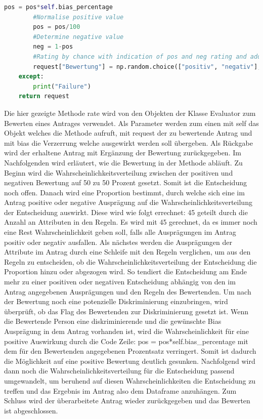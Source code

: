 \begin{onehalfspace}
\begin{lstlisting}[language=Python,label={lst:Evaluator_rate},caption=Methode eines Bewertenden zum Bewerten von Anträgen]
                    pos = pos*self.bias_percentage
        #Normalise positive value
        pos = pos/100
        #Determine negative value
        neg = 1-pos
        #Rating by chance with indication of pos and neg rating and adding the rating to the request. 
        request["Bewertung"] = np.random.choice(["positiv", "negativ"], p=[pos, neg])
    except:
        print("Failure")
    return request
\end{lstlisting}
Die hier gezeigte Methode \glqq{}rate\grqq{} wird von den Objekten der Klasse \glqq{}Evaluator\grqq{} zum Bewerten eines Antrages verwendet. Als Parameter werden zum einen mit \glqq{}self\grqq{} das Objekt welches die Methode aufruft, mit \glqq{}request\grqq{} der zu bewertende Antrag und mit \glqq{}bias\grqq{} die Verzerrung welche ausgewirkt werden soll übergeben. Als Rückgabe wird der erhaltene Antrag mit Ergänzung der Bewertung zurückgegeben. Im Nachfolgenden wird erläutert, wie die Bewertung in der Methode abläuft.
Zu Beginn wird die Wahrscheinlichkeitsverteilung zwischen der positiven und negativen Bewertung auf 50 zu 50 Prozent gesetzt. Somit ist die Entscheidung noch offen. Danach wird eine Proportion bestimmt, durch welche sich eine im Antrag positive oder negative Ausprägung auf die Wahrscheinlichkeitsverteilung der Entscheidung auswirkt. Diese wird wie folgt errechnet: 45 geteilt durch die Anzahl an Attributen in den Regeln. Es wird mit 45 gerechnet, da es immer noch eine Rest Wahrscheinlichkeit geben soll, falls alle Ausprägungen im Antrag positiv oder negativ ausfallen. Als nächstes werden die Ausprägungen der Attribute im Antrag durch eine Schleife mit den Regeln verglichen, um aus den Regeln zu entscheiden, ob die Wahrscheinlichkeitsverteilung der Entscheidung die Proportion hinzu oder abgezogen wird. So tendiert die Entscheidung am Ende mehr zu einer positiven oder negativen Entscheidung abhängig von den im Antrag angegebenen Ausprägungen und den Regeln des Bewertenden. Um nach der Bewertung noch eine potenzielle Diskriminierung einzubringen, wird überprüft, ob das Flag des Bewertenden zur Diskriminierung gesetzt ist. Wenn die Bewertende Person eine diskriminierende und die gewünschte Bias Ausprägung in dem Antrag vorhanden ist, wird die Wahrscheinlichkeit für eine positive Auswirkung durch die Code Zeile: \glqq{}pos = pos*self.bias\_percentage\grqq{} mit dem für den Bewertenden angegebenen Prozentsatz verringert. Somit ist dadurch die Möglichkeit auf eine positive Bewertung deutlich gesunken. Nachfolgend wird dann noch die Wahrscheinlichkeitsverteilung für die Entscheidung passend umgewandelt, um beruhend auf diesen Wahrscheinlichkeiten die Entscheidung zu treffen und das Ergebnis im Antrag also dem Dataframe anzuhängen. Zum Schluss wird der überarbeitete Antrag wieder zurückgegeben und das Bewerten ist abgeschlossen.\\

\end{onehalfspace}
